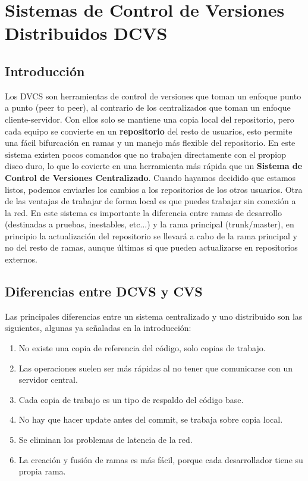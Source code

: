 \section{Sistemas de Control de Versiones Distribuidos DCVS}
\subsection{Introducción}
Los DVCS son herramientas de control de versiones que toman un enfoque punto a punto (peer to peer), al contrario de los centralizados que toman 
un enfoque cliente-servidor. Con ellos solo se mantiene una copia local del repositorio, pero cada equipo se convierte en un \textbf{repositorio} del
resto de usuarios, esto permite una fácil bifurcación en ramas y un manejo más flexible del repositorio.
En este sistema existen pocos comandos que no trabajen directamente con el propiop disco duro, lo que lo covierte en una herramienta más rápida
que un \textbf{Sistema de Control de Versiones Centralizado}. Cuando hayamos decidido que estamos listos, podemos enviarles los cambios a los repositorios de 
los otros usuarios. Otra de las ventajas de trabajar de forma local es que puedes trabajar sin conexión a la red.
En este sistema es importante la diferencia entre ramas de desarrollo (destinadas a pruebas, inestables, etc...) y la rama principal (trunk/master),
en principio la actualización del repositorio se llevará a cabo de la rama principal y no del resto de ramas, aunque últimas si que pueden
actualizarse en repositorios externos.

\subsection{Diferencias entre DCVS y CVS}
Las principales diferencias entre un sistema centralizado y uno distribuido son las siguientes, algunas ya señaladas en la introducción:
\begin{enumerate}
\item No existe una copia de referencia del código, solo copias de trabajo.
\item Las operaciones suelen ser más rápidas al no tener que comunicarse con un servidor central.
\item Cada copia de trabajo es un tipo de respaldo del código base.
\item No hay que hacer update antes del commit, se trabaja sobre copia local.
\item Se eliminan los problemas de latencia de la red.
\item La creación y fusión de ramas es más fácil, porque cada desarrollador tiene su propia rama.
\end{enumerate}

